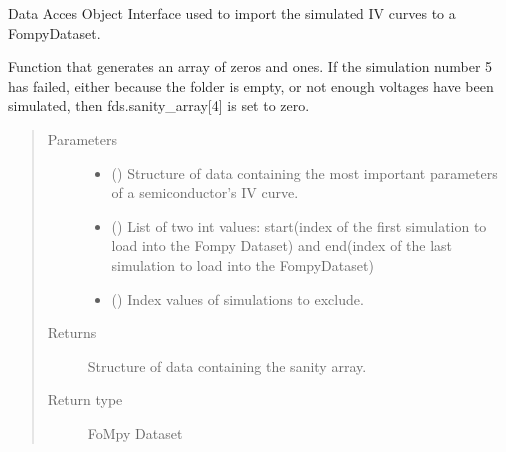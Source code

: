 \documentclass[letterpaper,10pt,english,openany, oneside]{sphinxmanual}
\begin{document}
\begin{fulllineitems}
\label{\detokenize{index:fompy.fds.dataDAO}}
Data Acces Object Interface used to import the simulated IV curves to a FompyDataset.

\end{fulllineitems}


\begin{fulllineitems}
\label{\detokenize{index:fompy.fds.exclude_indexes}}
Function that generates an array of zeros and ones. If the simulation
number 5 has failed, either because the folder is empty, or not enough voltages
have been simulated, then fds.sanity\_array{[}4{]} is set to zero.
\begin{quote}\begin{description}
\item[{Parameters}] \leavevmode\begin{itemize}
\item {} 
 () \textendash{} Structure of data containing the most important parameters of a semiconductor’s IV curve.

\item {} 
 () \textendash{} List of two int values: start(index of the first simulation to load into the Fompy Dataset)
and end(index of the last simulation to load into the FompyDataset)

\item {} 
 () \textendash{} Index values of simulations to exclude.

\end{itemize}

\item[{Returns}] \leavevmode
{} \textendash{} Structure of data containing the sanity array.

\item[{Return type}] \leavevmode
FoMpy Dataset

\end{description}\end{quote}

\end{fulllineitems}
\end{document}

